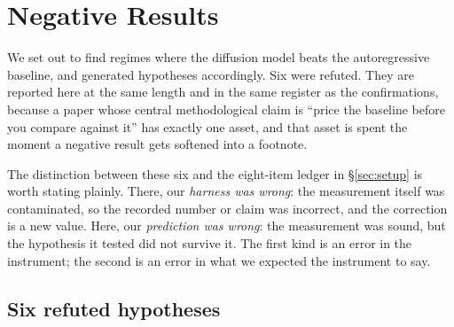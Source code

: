 \section{Negative Results}
\label{sec:negative}

We set out to find regimes where the diffusion model beats the autoregressive
baseline, and generated hypotheses accordingly. Six were refuted. They are
reported here at the same length and in the same register as the
confirmations, because a paper whose central methodological claim is ``price
the baseline before you compare against it'' has exactly one asset, and that
asset is spent the moment a negative result gets softened into a footnote.

The distinction between these six and the eight-item ledger in
\S\ref{sec:setup} is worth stating plainly. There, our \emph{harness was
wrong}: the measurement itself was contaminated, so the recorded number or
claim was incorrect, and the correction is a new value. Here, our
\emph{prediction was wrong}: the measurement was sound, but the hypothesis it
tested did not survive it. The first kind is an error in the instrument; the
second is an error in what we expected the instrument to say.

\subsection{Six refuted hypotheses}

